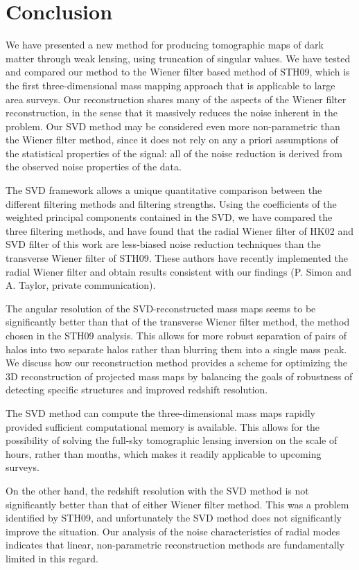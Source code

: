 \section{Conclusion}
\label{Conclusions}

We have presented a new method for producing tomographic maps of dark matter
through weak lensing, using truncation of singular values.  We have
tested and compared our method to the Wiener filter based
method of STH09, which is the first three-dimensional mass mapping
approach that is applicable to large area surveys. Our reconstruction
shares many of the aspects of the Wiener filter reconstruction,
in the sense that it massively reduces the noise inherent in the problem.
Our SVD method may be considered even more non-parametric
than the Wiener filter method, since it does not rely on any a priori 
assumptions of the statistical properties of the signal: all of the noise 
reduction is derived from the observed noise properties of the data.

The SVD framework allows a unique quantitative comparison between the
different filtering methods and filtering strengths.  Using the
coefficients of the weighted principal components contained in the SVD,
we have compared the three filtering methods, and have found that 
the radial Wiener filter of HK02 and SVD filter of this work are 
less-biased noise reduction techniques than the transverse Wiener filter
of STH09.  These authors have recently implemented the radial Wiener 
filter and obtain results consistent with our findings (P. Simon and 
A. Taylor, private communication).

The angular resolution of the SVD-reconstructed mass maps seems to 
be significantly better than that of the transverse Wiener filter method,
the method chosen in the STH09 analysis.
This allows for more robust separation of pairs of halos into two 
separate halos rather than blurring them into a single mass peak.  
We discuss how our reconstruction method provides a scheme for
optimizing the 3D reconstruction of projected mass maps by
balancing the goals of robustness of detecting specific structures
and improved redshift resolution. 

The SVD method can compute the three-dimensional mass maps
rapidly provided sufficient computational memory is available. 
This allows for the possibility of solving the full-sky tomographic
lensing inversion on the scale of hours, rather than months, which
makes it readily applicable to upcoming surveys. 

On the other hand, the redshift resolution with the SVD method is not
significantly  better than that of either Wiener filter method.  
This was a problem identified by STH09, and unfortunately
the SVD method does not significantly improve the situation. 
Our analysis of the noise characteristics of radial modes 
indicates that linear, non-parametric reconstruction methods are
fundamentally limited in this regard.
